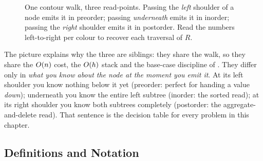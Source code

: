 \begin{figure}[H]
\centering
{}
\caption{One contour walk, three read-points. Passing the \emph{left} shoulder of a
node emits it in preorder; passing \emph{underneath} emits it in inorder; passing the
\emph{right} shoulder emits it in postorder. Read the numbers left-to-right per colour
to recover each traversal of $R$.}\label{fig:c03-contour}
\end{figure}

The picture explains why the three are siblings: they share the walk, so they share the
$O(n)$ cost, the $O(h)$ stack and the base-case discipline of
. They differ only in \emph{what you know about the node at the
moment you emit it}. At its left shoulder you know nothing below it yet (preorder:
perfect for handing a value \emph{down}); underneath you know the entire left subtree
(inorder: the sorted read); at its right shoulder you know both subtrees completely
(postorder: the aggregate-and-delete read). That sentence is the decision table for
every problem in this chapter.

\subsection{Definitions and Notation}


